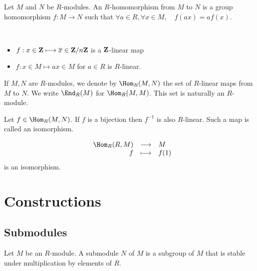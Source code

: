 \begin{dfn}
    Let $M$ and $N$ be $R$-modules. An $R$-homomorphism\footnotemark{} from $M$ to $N$ is a group homomorphism $f: M \longrightarrow N$ such that $\forall a\in R, \forall x\in M, \quad f(ax)=af(x)$.
\end{dfn}


\begin{ex}~
\begin{itemize}
    \item $f : x\in \mathbf Z \longmapsto \overline{x} \in \mathbf Z / n\mathbf Z $ is a $\mathbf Z$-linear map 
    \item $f : x\in M \longmapsto ax\in M$ for $a\in R$ is $R$-linear.
\end{itemize}
\end{ex}

\begin{dfn}
If $M,N$ are $R$-modules, we denote by $\Hom_R(M, N)$ the set of $R$-linear maps from $M$ to $N$. We write $\End_R(M)$ for $\Hom_R(M,M)$. This set is naturally an $R$-module.
\end{dfn}

\begin{prop}
    Let $f\in \Hom_R(M,N)$. If $f$ is a bijection then $f^{-1}$ is also $R$-linear. Such a map is called an isomorphism.
\end{prop}

\begin{ex}
\[
\begin{array}{rrcl}
    &  \Hom_R(R, M)& \longrightarrow & M \\
    & f & \longmapsto & \displaystyle f(1) 
\end{array}
\] 
is an isomorphism.
\end{ex}

\section{Constructions}

\subsection{Submodules}

\begin{dfn}
    Let $M$ be an $R$-module. A submodule $N$ of $M$ is a subgroup of $M$ that is stable under multiplication by elements of $R$.
\end{dfn}

